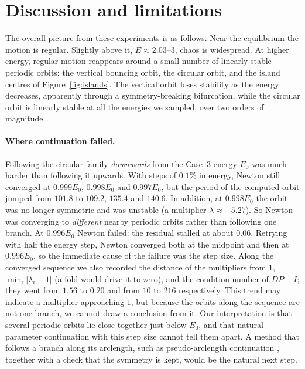 \documentclass[11pt,a4paper]{article}
\begin{document}
\section{Discussion and limitations}\label{sec:discussion}

The overall picture from these experiments is as follows. Near the equilibrium
the motion is regular. Slightly above it, $E\approx2.03$--$3$, chaos is
widespread. At higher energy, regular motion reappears around a small number of
linearly stable periodic orbits: the vertical bouncing orbit, the circular
orbit, and the island centres of Figure~\ref{fig:islands}. The vertical orbit
loses stability as the energy decreases, apparently through a symmetry-breaking
bifurcation, while the circular orbit is linearly stable at all the energies
we sampled, over two orders of magnitude.

\paragraph{Where continuation failed.}
Following the circular family \emph{downwards} from the Case~3 energy $E_0$
was much harder than following it upwards. With steps of $0.1\%$ in energy,
Newton still converged at $0.999E_0$, $0.998E_0$ and $0.997E_0$, but the
period of the computed orbit jumped from $101.8$ to $109.2$, $135.4$ and
$140.6$. In addition, at $0.998E_0$ the orbit was no longer symmetric and was
unstable (a multiplier $\lambda\approx-5.27$). So Newton was converging to
\emph{different} nearby periodic orbits rather than following one branch. At
$0.996E_0$ Newton failed: the residual stalled at about $0.06$. Retrying with
half the energy step, Newton converged both at the midpoint and then at
$0.996E_0$, so the immediate cause of the failure was the step size. Along the
converged sequence we also recorded the distance of the multipliers from $1$,
$\min_i|\lambda_i-1|$ (a fold would drive it to zero), and the condition number
of $DP-I$; they went from $1.56$ to $0.20$ and from $10$ to $216$ respectively.
This trend may indicate a multiplier approaching $1$, but because the orbits
along the sequence are not one branch, we cannot draw a conclusion from it.
Our interpretation is that several periodic orbits lie close together just
below $E_0$, and that natural-parameter continuation with this step size
cannot tell them apart. A method that
follows a branch along its arclength, such as pseudo-arclength continuation
\cite{kuznetsov}, together with a check that the symmetry is kept, would be the
natural next step.
\end{document}
